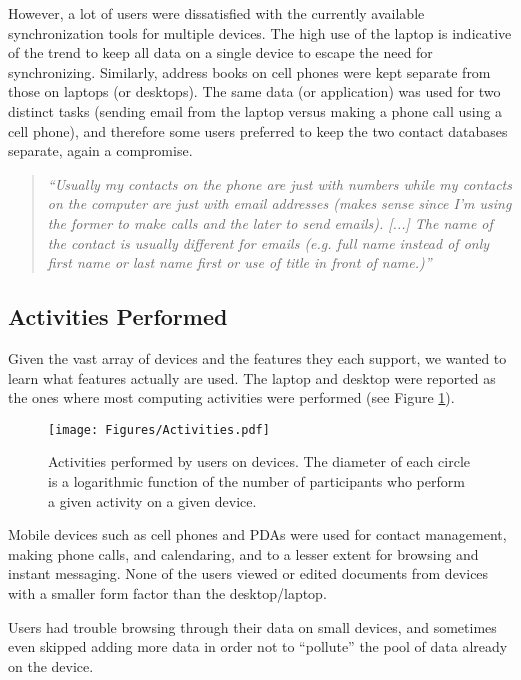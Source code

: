 \documentclass[twocolumn,final,10pt]{article}
\begin{document}
However, a lot of users were dissatisfied with the currently available synchronization tools for multiple devices. The high use of the laptop is indicative of the trend to keep all data on a single device to escape the need for synchronizing. Similarly, address books on cell phones were kept separate from those on laptops (or desktops). The same data (or application) was used for two distinct tasks (sending email from the laptop versus making a phone call using a cell phone), and therefore some users preferred to keep the two contact databases separate, again a compromise.

\begin{quotation}
\textit{
``Usually my contacts on the phone are just with numbers while my contacts on the computer are just with email addresses (makes sense since I'm using the former to make calls and the later to send emails). [...] The name of the contact is usually different for emails (e.g. full name instead of only first name or last name first or use of title in front of name.)''
}
\end{quotation}

\subsection{Activities Performed}

Given the vast array of devices and the features they each support, we wanted to learn what features actually are used. The laptop and desktop were reported as the ones where most computing activities were performed (see Figure \ref{figure:activities}).

\begin{figure}[htb]
\begin{center}
\texttt{[image: Figures/Activities.pdf]}
\caption{Activities performed by users on devices. The diameter of each circle is a logarithmic function of the number of participants who perform a given activity on a given device.}
\label{figure:activities}
\end{center}
\end{figure}

Mobile devices such as cell phones and PDAs were used for contact management, making phone calls, and calendaring, and to a lesser extent for browsing and instant messaging. None of the users viewed or edited documents from devices with a smaller form factor than the desktop/laptop.

Users had trouble browsing through their data on small devices, and sometimes even skipped adding more data in order not to ``pollute'' the pool of data already on the device.
\end{document}
